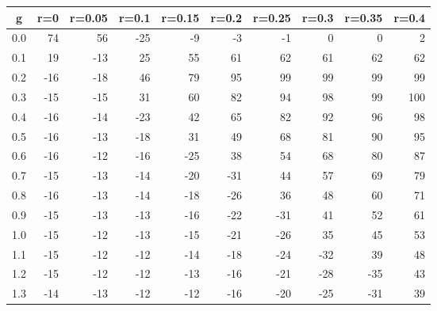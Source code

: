 %
\begin{table}[!tbp]
 \begin{center}
 \begin{tabular}{rrrrrrrrrr}\hline\hline
\multicolumn{1}{c}{g}&\multicolumn{1}{c}{r=0}&\multicolumn{1}{c}{r=0.05}&\multicolumn{1}{c}{r=0.1}&\multicolumn{1}{c}{r=0.15}&\multicolumn{1}{c}{r=0.2}&\multicolumn{1}{c}{r=0.25}&\multicolumn{1}{c}{r=0.3}&\multicolumn{1}{c}{r=0.35}&\multicolumn{1}{c}{r=0.4}\tabularnewline
\hline
0.0& 74& 56&-25& -9& -3& -1&  0&  0&  2\tabularnewline
0.1& 19&-13& 25& 55& 61& 62& 61& 62& 62\tabularnewline
0.2&-16&-18& 46& 79& 95& 99& 99& 99& 99\tabularnewline
0.3&-15&-15& 31& 60& 82& 94& 98& 99&100\tabularnewline
0.4&-16&-14&-23& 42& 65& 82& 92& 96& 98\tabularnewline
0.5&-16&-13&-18& 31& 49& 68& 81& 90& 95\tabularnewline
0.6&-16&-12&-16&-25& 38& 54& 68& 80& 87\tabularnewline
0.7&-15&-13&-14&-20&-31& 44& 57& 69& 79\tabularnewline
0.8&-16&-13&-14&-18&-26& 36& 48& 60& 71\tabularnewline
0.9&-15&-13&-13&-16&-22&-31& 41& 52& 61\tabularnewline
1.0&-15&-12&-13&-15&-21&-26& 35& 45& 53\tabularnewline
1.1&-15&-12&-12&-14&-18&-24&-32& 39& 48\tabularnewline
1.2&-15&-12&-12&-13&-16&-21&-28&-35& 43\tabularnewline
1.3&-14&-13&-12&-12&-16&-20&-25&-31& 39\tabularnewline
\hline
\end{tabular}

\end{center}

\end{table}

